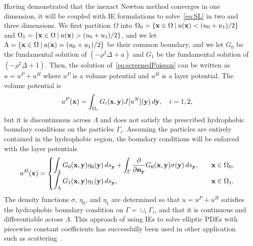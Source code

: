 %   
Having demonstrated that the inexact Newton method converges in one
dimension, it will be coupled with IE formulations to 
solve~\eqref{eq:SL} in two and three dimensions. We first partition
$\Omega$ into $\Omega_0 = \{\mathbf{x} \in \Omega \:|\: u(\mathbf{x}) < (u_0 +
u_1)/2\}$ and $\Omega_1 = \{\mathbf{x} \in \Omega \:|\: u(\mathbf{x}) > (u_0 +
u_1)/2\}$, and we let $\Lambda = \{\mathbf{x} \in \Omega \:|\: u(\mathbf{x}) = (u_0 +
u_1)/2 \}$ be their common boundary, and we let $G_0$ be the fundamental
solution of $(-\rho^2 \Delta + a)$ and $G_1$ be the fundamental
solution of $(-\rho^2 \Delta + 1)$. Then, the solution
of~\eqref{eq:screenedPoisson} can be written as $u = u^P + u^H$ where
$u^P$ is a volume potential and $u^H$ is a layer potential. The volume
potential is
\begin{align*}
  u^{P}(\mathbf{x}) = \int_{\Omega_i} G_i(\mathbf{x},\mathbf{y}) J[u^N](\mathbf{y})\, d\mathbf{y}, 
    \quad i = 1,2,
\end{align*}
but it is discontinuous across $\Lambda$ and does not satisfy the
prescribed hydrophobic boundary conditions on the particles $\Gamma_i$.
Assuming the particles are entirely contained in the hydrophobic region,
the boundary conditions will be enforced with the layer potentials
\begin{align*}
  u^{H}(\mathbf{x}) = \begin{cases}
    \displaystyle\int_{\Lambda} G_0(\mathbf{x},\mathbf{y}) \eta_0(\mathbf{y}) \, ds_{\mathbf{y}} + 
    \displaystyle\int_{\Gamma} \frac{\partial }{\partial \mathbf{n}_{\mathbf{y}}} G_0(\mathbf{x},\mathbf{y})
      \sigma(\mathbf{y}) \,ds_{\mathbf{y}}, \quad & \mathbf{x} \in \Omega_0, \\
    \displaystyle\int_{\Lambda} G_1(\mathbf{x},\mathbf{y}) \eta_1(\mathbf{y}) \, ds_{\mathbf{y}},
     & \mathbf{x} \in \Omega_1.
  \end{cases}
\end{align*}
The density functions $\sigma$, $\eta_0$, and $\eta_1$ are determined so
that $u = u^P + u^H$ satisfies the hydrophobic boundary condition on
$\Gamma = \cup_i \Gamma_i$, and that it is continuous and differentiable
across $\Lambda$. This approach of using IEs to solve elliptic PDEs with
piecewise constant coefficients has successfully been used in other
application such as scattering~\cite{hyu-bar2014, che-cho-cai2018}.

